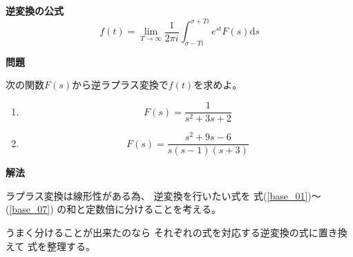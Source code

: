 \documentclass[12pt,b5paper]{ltjsarticle}
\begin{document}
\textbf{逆変換の公式}
\begin{equation}
 f(t) = \lim_{T\rightarrow\infty} \frac{1}{2\pi i}
  \int_{\sigma -Ti}^{\sigma +Ti} e^{st}F(s)\mathrm{d}s
\end{equation}


\hrulefill
\textbf{問題}
\hrulefill

次の関数$F(s)$から逆ラプラス変換で$f(t)$を求めよ。
\begin{enumerate}
 \item
      \begin{equation}
       F(s) = \frac{1}{s^2+3s+2}
      \end{equation}

 \item
      \begin{equation}
       F(s) = \frac{s^2+9s-6}{s(s-1)(s+3)}
      \end{equation}

\end{enumerate}

\dotfill

\textbf{解法}

ラプラス変換は線形性がある為、
逆変換を行いたい式を
式(\ref{base_01})～(\ref{base_07})
の和と定数倍に分けることを考える。

うまく分けることが出来たのなら
それぞれの式を対応する逆変換の式に置き換えて
式を整理する。

\dotfill
\end{document}
